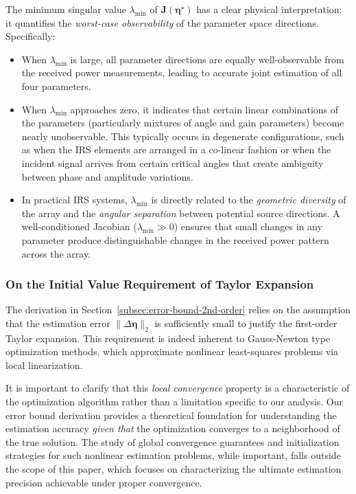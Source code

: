 \documentclass[journal]{IEEEtran}
\begin{document}
The minimum singular value $\lambda_{\min}$ of $\mathbf{J}(\boldsymbol{\eta}^\star)$ has a clear physical interpretation: it quantifies the \textit{worst-case observability} of the parameter space directions. Specifically:

\begin{itemize}
    \item When $\lambda_{\min}$ is large, all parameter directions are equally well-observable from the received power measurements, leading to accurate joint estimation of all four parameters.
    
    \item When $\lambda_{\min}$ approaches zero, it indicates that certain linear combinations of the parameters (particularly mixtures of angle and gain parameters) become nearly unobservable. This typically occurs in degenerate configurations, such as when the IRS elements are arranged in a co-linear fashion or when the incident signal arrives from certain critical angles that create ambiguity between phase and amplitude variations.
    
    \item In practical IRS systems, $\lambda_{\min}$ is directly related to the \textit{geometric diversity} of the array and the \textit{angular separation} between potential source directions. A well-conditioned Jacobian ($\lambda_{\min} \gg 0$) ensures that small changes in any parameter produce distinguishable changes in the received power pattern across the array.
\end{itemize}

\subsubsection{On the Initial Value Requirement of Taylor Expansion}
\label{subsubsec:initial-value}

The derivation in Section~\ref{subsec:error-bound-2nd-order} relies on the assumption that the estimation error $\|\Delta\boldsymbol{\eta}\|_2$ is sufficiently small to justify the first-order Taylor expansion. This requirement is indeed inherent to Gauss-Newton type optimization methods, which approximate nonlinear least-squares problems via local linearization. 

It is important to clarify that this \textit{local convergence} property is a characteristic of the optimization algorithm rather than a limitation specific to our analysis. Our error bound derivation provides a theoretical foundation for understanding the estimation accuracy \textit{given that} the optimization converges to a neighborhood of the true solution. The study of global convergence guarantees and initialization strategies for such nonlinear estimation problems, while important, falls outside the scope of this paper, which focuses on characterizing the ultimate estimation precision achievable under proper convergence.
\end{document}

